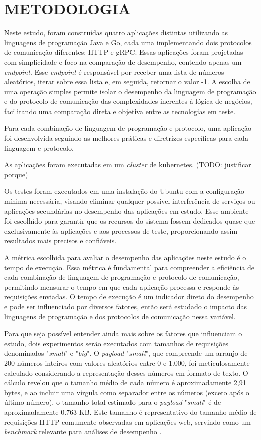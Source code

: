 \chapter{METODOLOGIA}

Neste estudo, foram construídas quatro aplicações distintas utilizando as linguagens de programação Java e Go, cada uma implementando dois protocolos de comunicação diferentes: HTTP e gRPC.
Essas aplicações foram projetadas com simplicidade e foco na comparação de desempenho, contendo apenas um \textit{endpoint}.
Esse \textit{endpoint} é responsável por receber uma lista de números aleatórios, iterar sobre essa lista e, em seguida, retornar o valor -1.
A escolha de uma operação simples permite isolar o desempenho da linguagem de programação e do protocolo de comunicação das complexidades inerentes à lógica de negócios, facilitando uma comparação direta e objetiva entre as tecnologias em teste.

Para cada combinação de linguagem de programação e protocolo, uma aplicação foi desenvolvida seguindo as melhores práticas e diretrizes específicas para cada linguagem e protocolo.

As aplicações foram executadas em um \textit{cluster} de kubernetes. (TODO: justificar porque)

Os testes foram executados em uma instalação do Ubuntu com a configuração mínima necessária, visando eliminar qualquer possível interferência de serviços ou aplicações secundárias no desempenho das aplicações em estudo.
Esse ambiente foi escolhido para garantir que os recursos do sistema fossem dedicados quase que exclusivamente às aplicações e aos processos de teste, proporcionando assim resultados mais precisos e confiáveis.

A métrica escolhida para avaliar o desempenho das aplicações neste estudo é o tempo de execução.
Essa métrica é fundamental para compreender a eficiência de cada combinação de linguagem de programação e protocolo de comunicação, permitindo mensurar o tempo em que cada aplicação processa e responde às requisições enviadas.
O tempo de execução é um indicador direto do desempenho e pode ser influenciado por diversos fatores, então será estudado o impacto das linguagens de programação e dos protocolos de comunicação nessa variável.

Para que seja possível entender ainda mais sobre os fatores que influenciam o estudo, dois experimentos serão executados com tamanhos de requisições denominados "\textit{small}" e "\textit{big}".
O \textit{payload} "\textit{small}", que compreende um arranjo de 200 números inteiros com valores aleatórios entre 0 e 1.000, foi meticulosamente calculado considerando a representação desses números em formato de texto.
O cálculo revelou que o tamanho médio de cada número é aproximadamente 2,91 bytes, e ao incluir uma vírgula como separador entre os números (exceto após o último número), o tamanho total estimado para o \textit{payload} "\textit{small}" é de aproximadamente 0.763 KB.
Este tamanho é representativo do tamanho médio de requisições HTTP comumente observadas em aplicações web, servindo como um \textit{benchmark} relevante para análises de desempenho \cite{chromium2012spdy}.

